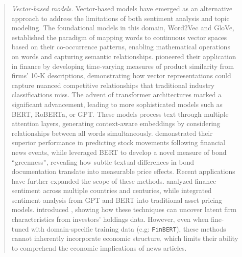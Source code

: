 \begin{quote}
\hspace{0.5cm} \textit{Vector-based models.} 
Vector-based models have emerged as an alternative approach to address the limitations of both sentiment analysis and topic modeling. The foundational models in this domain, Word2Vec and GloVe, established the paradigm of mapping words to continuous vector spaces based on their co-occurrence patterns, enabling mathematical operations on words and capturing semantic relationships.
\cite{hoberg2016text} %
pioneered their application in finance by developing time-varying measures of product similarity from firms' 10-K descriptions, demonstrating how vector representations could capture nuanced competitive relationships that traditional industry classifications miss.
%
The advent of transformer architectures marked a significant advancement, leading to more sophisticated models such as BERT, RoBERTa, or GPT. These models process text through multiple attention layers, generating context-aware embeddings by considering relationships between all words simultaneously. 
\cite{chen2021stock} %
demonstrated their superior performance in predicting stock movements following financial news events, while 
\cite{benincasa2022different} %
leveraged BERT to develop a novel measure of bond ``greenness'', revealing how subtle textual differences in bond documentation translate into measurable price effects.
%
Recent applications have further expanded the scope of these methods. 
\cite{jha2022does} %
analyzed finance sentiment across multiple countries and centuries, while 
\cite{zhang2023feel} %
integrated sentiment analysis from GPT and BERT into traditional asset pricing models. 
\cite{gabaix2023asset} %
introduced , showing how these techniques can uncover latent firm characteristics from investors' holdings data. However, even when fine-tuned with domain-specific training data (e.g: \texttt{FinBERT}), these methods cannot inherently incorporate economic structure, which limits their ability to comprehend the economic implications of news articles.
\end{quote}

